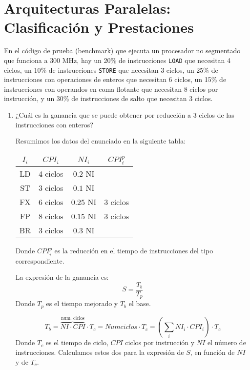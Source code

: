 \section{Arquitecturas Paralelas: Clasificación y Prestaciones}


\begin{ejercicio}
    En el código de prueba (benchmark) que ejecuta un procesador no segmentado que funciona a
    $300$ MHz, hay un 20\% de instrucciones \verb|LOAD| que necesitan 4 ciclos, un 10\% de
    instrucciones \verb|STORE| que necesitan 3 ciclos, un 25\% de instrucciones con operaciones de
    enteros que necesitan 6 ciclos, un 15\% de instrucciones con operandos en coma flotante que
    necesitan 8 ciclos por instrucción, y un 30\% de instrucciones de salto que necesitan 3 ciclos.
    \begin{enumerate}
        \item ¿Cuál es la ganancia que se puede obtener por reducción a 3 ciclos de las instrucciones
        con enteros?


        Resumimos los datos del enunciado en la siguiente tabla:
        \begin{table}[H]
            \centering
            \begin{tabular}{c|c|c|c}
                $I_i$ & $CPI_i$ & $NI_i$ & $CPI_i^p$ \\
                \hline
                LD & 4 ciclos & $0.2$ NI & \\ 
                ST & 3 ciclos & $0.1$ NI & \\
                FX & 6 ciclos & $0.25$ NI &  3 ciclos \\
                FP & 8 ciclos & $0.15$ NI & 3 ciclos \\
                BR & 3 ciclos & $0.3$ NI &
            \end{tabular}
        \end{table}

        Donde $CPI_i^p$ es la reducción en el tiempo de instrucciones del tipo correspondiente.

        La expresión de la ganancia es:
        \begin{equation*}
            S = \dfrac{T_b}{T_p}
        \end{equation*}
        Donde $T_p$ es el tiempo mejorado y $T_b$ el base.

        \begin{equation*}
            T_b = \overbrace{NI \cdot CPI}^{\text{num. ciclos}} \cdot T_c = Num ciclos \cdot T_c = \left(\sum_{i} NI_i \cdot CPI_i\right)\cdot T_c
        \end{equation*}
        Donde $T_c$ es el tiempo de ciclo, $CPI$ ciclos por instrucción y $NI$ el número de instrucciones. Calculamos estos dos para la expresión de $S$, en función de $NI$ y de $T_c$.
        

\end{enumerate}
\end{ejercicio}
